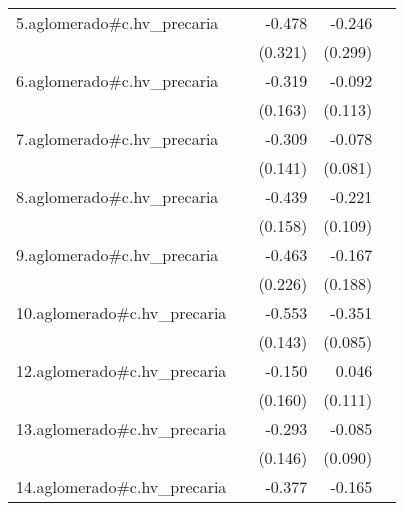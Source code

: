 {\begin{longtable}{l*{4}{D{.}{.}{-1}}}
\addlinespace
5.aglomerado#c.hv\_precaria&                     &      -0.478         &      -0.246         &                     \\
            &                     &     (0.321)         &     (0.299)         &                     \\
\addlinespace
6.aglomerado#c.hv\_precaria&                     &      -0.319         &      -0.092         &                     \\
            &                     &     (0.163)         &     (0.113)         &                     \\
\addlinespace
7.aglomerado#c.hv\_precaria&                     &      -0.309\sym{*}  &      -0.078         &                     \\
            &                     &     (0.141)         &     (0.081)         &                     \\
\addlinespace
8.aglomerado#c.hv\_precaria&                     &      -0.439\sym{**} &      -0.221\sym{*}  &                     \\
            &                     &     (0.158)         &     (0.109)         &                     \\
\addlinespace
9.aglomerado#c.hv\_precaria&                     &      -0.463\sym{*}  &      -0.167         &                     \\
            &                     &     (0.226)         &     (0.188)         &                     \\
\addlinespace
10.aglomerado#c.hv\_precaria&                     &      -0.553\sym{***}&      -0.351\sym{***}&                     \\
            &                     &     (0.143)         &     (0.085)         &                     \\
\addlinespace
12.aglomerado#c.hv\_precaria&                     &      -0.150         &       0.046         &                     \\
            &                     &     (0.160)         &     (0.111)         &                     \\
\addlinespace
13.aglomerado#c.hv\_precaria&                     &      -0.293\sym{*}  &      -0.085         &                     \\
            &                     &     (0.146)         &     (0.090)         &                     \\
\addlinespace
14.aglomerado#c.hv\_precaria&                     &      -0.377         &      -0.165         &                     \\

\end{longtable}}
